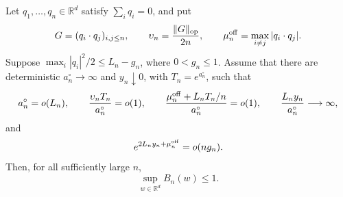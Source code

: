 \begin{proposition}
\label{prop:refined-deterministic-gram}
Let \(q_1,\ldots,q_n\in\mathbb R^d\) satisfy \(\sum_iq_i=0\), and put
\[
 G=(q_i\cdot q_j)_{i,j\le n},
 \qquad
 \upsilon_n=\frac{\|G\|_{\mathrm{op}}}{2n},
 \qquad
 \mu_n^{\rm off}=\max_{i\ne j}|q_i\cdot q_j|.
\]
Suppose \(\max_i|q_i|^2/2\le L_n-g_n\), where \(0<g_n\le1\).  Assume that
there are deterministic \(a_n^\circ\to\infty\) and \(y_n\downarrow0\),
with \(T_n=e^{a_n^\circ}\), such that
\begin{equation}
\label{eq:refined-gram-conditions}
 a_n^\circ=o(L_n),\qquad
 \frac{\upsilon_nT_n}{a_n^\circ}=o(1),\qquad
 \frac{\mu_n^{\rm off}+L_nT_n/n}{a_n^\circ}=o(1),\qquad
 \frac{L_ny_n}{a_n^\circ}\longrightarrow\infty,
\end{equation}
and
\begin{equation}
\label{eq:refined-vertex-condition}
 e^{2L_ny_n+\mu_n^{\rm off}}=o(ng_n).
\end{equation}
Then, for all sufficiently large \(n\),
\[
 \sup_{w\in\mathbb R^d}B_n(w)\le1.
\]
\end{proposition}


